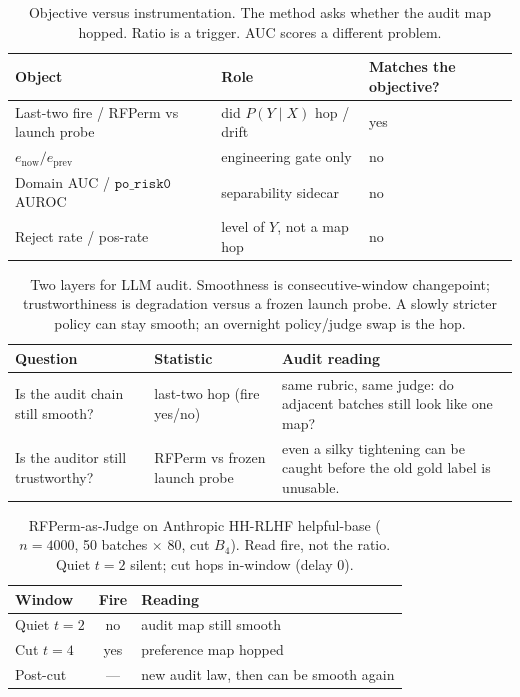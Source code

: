 
\begin{table}[ht]
\centering
\caption{Objective versus instrumentation. The method asks whether the
audit map hopped. Ratio is a trigger. AUC scores a different problem.}
\label{tab:llm-audit-objective}
\small
\begin{tabular}{@{}lll@{}}
\toprule
Object & Role & Matches the objective? \\
\midrule
Last-two fire / RFPerm vs launch probe &
did \(P(Y\mid X)\) hop / drift & yes \\
\(e_{\mathrm{now}}/e_{\mathrm{prev}}\) &
engineering gate only & no \\
Domain AUC / \(\texttt{po\_risk0}\) AUROC &
separability sidecar & no \\
Reject rate / pos-rate &
level of \(Y\), not a map hop & no \\
\bottomrule
\end{tabular}
\end{table}

\begin{table}[ht]
\centering
\caption{Two layers for LLM audit. Smoothness is consecutive-window
changepoint; trustworthiness is degradation versus a frozen launch probe.
A slowly stricter policy can stay smooth; an overnight policy/judge swap is the hop.}
\label{tab:llm-audit-two-layers}
\small
\begin{tabular}{@{}p{3.4cm}p{4.2cm}p{5.2cm}@{}}
\toprule
Question & Statistic & Audit reading \\
\midrule
Is the audit chain still smooth? &
last-two hop (fire yes/no) &
same rubric, same judge: do adjacent batches still look like one map? \\
Is the auditor still trustworthy? &
RFPerm vs frozen launch probe &
even a silky tightening can be caught before the old gold label is unusable. \\
\bottomrule
\end{tabular}
\end{table}

\begin{table}[ht]
\centering
\caption{RFPerm-as-Judge on Anthropic HH-RLHF helpful-base
(\(n=4000\), 50 batches \(\times\) 80, cut \(B_4\)).
Read fire, not the ratio. Quiet \(t=2\) silent; cut hops in-window (delay 0).}
\label{tab:llm-audit-hh}
\small
\setlength{\tabcolsep}{3.5pt}
\begin{tabular}{@{}l c l@{}}
\toprule
Window & Fire & Reading \\
\midrule
Quiet \(t=2\) & no & audit map still smooth \\
Cut \(t=4\) & yes & preference map hopped \\
Post-cut & --- & new audit law, then can be smooth again \\
\bottomrule
\end{tabular}
\end{table}

